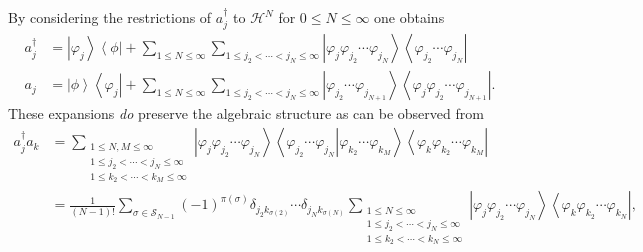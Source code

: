\documentclass[aps,preprint]{revtex4}%
\begin{document}
\bigskip By considering the restrictions of $a_{j}^{\dagger}$ to
$\mathcal{H}^{N}$ for $0\leq N\leq\infty$ one obtains%
\begin{align}
a_{j}^{\dagger}  &  =\left\vert \varphi_{j}\right\rangle \left\langle
\phi\right\vert +\sum_{1\leq N\leq\infty}\sum_{1\leq j_{2}<\cdots<j_{N}%
\leq\infty}\left\vert \varphi_{j}\varphi_{j_{2}}\cdots\varphi_{j_{N}%
}\right\rangle \left\langle \varphi_{j_{2}}\cdots\varphi_{j_{N}}\right\vert
\nonumber\\
a_{j}  &  =\left\vert \phi\right\rangle \left\langle \varphi_{j}\right\vert
+\sum_{1\leq N\leq\infty}\sum_{1\leq j_{2}<\cdots<j_{N}\leq\infty}\left\vert
\varphi_{j_{2}}\cdots\varphi_{j_{N+1}}\right\rangle \left\langle \varphi
_{j}\varphi_{j_{2}}\cdots\varphi_{j_{N+1}}\right\vert . \label{FQ}%
\end{align}
These expansions \emph{do }preserve the algebraic structure as can be observed
from%
\begin{align}
a_{j}^{\dagger}a_{k}  &  =\sum_{\substack{1\leq N,M\leq\infty\\1\leq
j_{2}<\cdots<j_{N}\leq\infty\\1\leq k_{2}<\cdots<k_{M}\leq\infty}}\left\vert
\varphi_{j}\varphi_{j_{2}}\cdots\varphi_{j_{N}}\right\rangle \left\langle
\left.  \varphi_{j_{2}}\cdots\varphi_{j_{N}}\right\vert \varphi_{k_{2}}%
\cdots\varphi_{k_{M}}\right\rangle \left\langle \varphi_{k}\varphi_{k_{2}%
}\cdots\varphi_{k_{M}}\right\vert \nonumber\\
&  =\frac{1}{\left(  N-1\right)  !}\sum_{\sigma\in\mathcal{S}_{N-1}}\left(
-1\right)  ^{\pi\left(  \sigma\right)  }\delta_{j_{2}k_{\sigma\left(
2\right)  }}\cdots\delta_{j_{N}k_{\sigma\left(  N\right)  }}\sum
_{\substack{1\leq N\leq\infty\\1\leq j_{2}<\cdots<j_{N}\leq\infty\\1\leq
k_{2}<\cdots<k_{N}\leq\infty}}\left\vert \varphi_{j}\varphi_{j_{2}}%
\cdots\varphi_{j_{N}}\right\rangle \left\langle \varphi_{k}\varphi_{k_{2}%
}\cdots\varphi_{k_{N}}\right\vert ,
\end{align}
\end{document}
